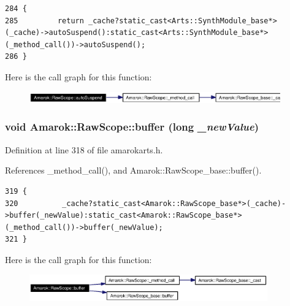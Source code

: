 \footnotesize\begin{verbatim}284 {
285         return _cache?static_cast<Arts::SynthModule_base*>(_cache)->autoSuspend():static_cast<Arts::SynthModule_base*>(_method_call())->autoSuspend();
286 }
\end{verbatim}\normalsize 


Here is the call graph for this function:\begin{figure}[H]
\begin{center}
\leavevmode
\includegraphics[width=307pt]{classAmarok_1_1RawScope_Amarok_1_1RawScopea10_cgraph}
\end{center}
\end{figure}
\subsubsection{\setlength{\rightskip}{0pt plus 5cm}void Amarok::Raw\-Scope::buffer (long {\em \_\-new\-Value})\hspace{0.3cm}{\tt  [inline]}}\label{classAmarok_1_1RawScope_Amarok_1_1RawScopea17}




Definition at line 318 of file amarokarts.h.

References \_\-method\_\-call(), and Amarok::Raw\-Scope\_\-base::buffer().



\footnotesize\begin{verbatim}319 {
320          _cache?static_cast<Amarok::RawScope_base*>(_cache)->buffer(_newValue):static_cast<Amarok::RawScope_base*>(_method_call())->buffer(_newValue);
321 }
\end{verbatim}\normalsize 


Here is the call graph for this function:\begin{figure}[H]
\begin{center}
\leavevmode
\includegraphics[width=291pt]{classAmarok_1_1RawScope_Amarok_1_1RawScopea17_cgraph}
\end{center}
\end{figure}
